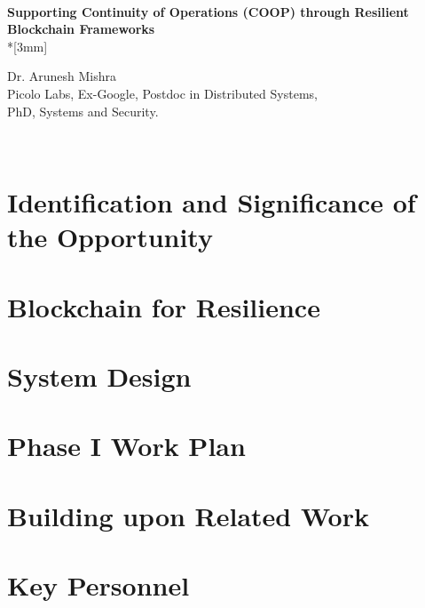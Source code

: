 \documentclass{proposal}
\begin{document}
\hfill \break
\\
\begin{center}
{\Large \bf Supporting Continuity of Operations (COOP) through Resilient Blockchain Frameworks } \\*[3mm]

Dr. Arunesh Mishra\\
Picolo Labs, Ex-Google, Postdoc in Distributed Systems,\\ PhD, Systems and Security.

\end{center}
\hfill \break
\\
\section{Identification and Significance of the Opportunity}


\section{Blockchain for Resilience}


\section{System Design}

\section{Phase I Work Plan}

\section{Building upon Related Work}


\section{Key Personnel}



\newpage
{}
\renewcommand{\thepage} {E--\arabic{page}}




%
\end{document}
